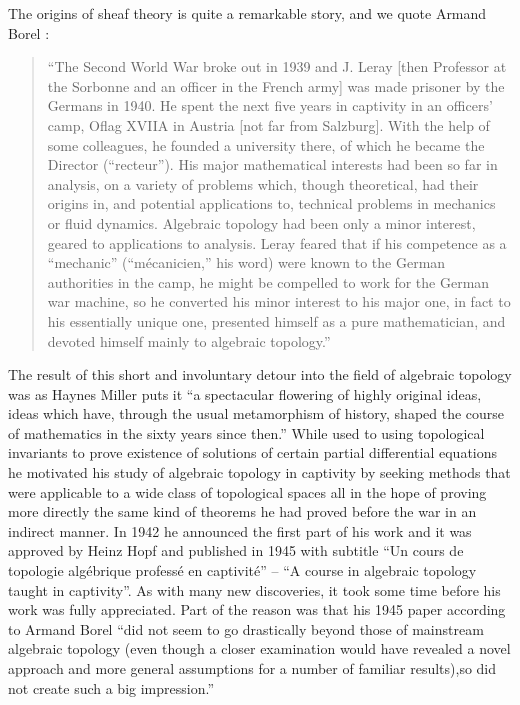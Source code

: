 \documentclass[../../thesis.tex]{subfiles}
\begin{document}
The origins of sheaf theory is quite a remarkable story, and we quote Armand Borel \cite{Borel}:
\begin{quotation}
    ``The Second World War broke out in 1939 and J. Leray [then Professor at the Sorbonne and an officer in the French army] was made prisoner by the Germans in 1940.
    He spent the next five years in captivity in an officers’ camp, Oflag XVIIA in Austria [not far from Salzburg].
    With the help of some colleagues, he founded a university there, of which he became the Director (“recteur”).
    His major mathematical interests had been so far in analysis, on a variety of problems which, though theoretical, had their origins in, and potential applications to, technical problems in mechanics or fluid dynamics.
    Algebraic topology had been only a minor interest, geared to applications to analysis. Leray feared that if his competence as a “mechanic” (“mécanicien,” his word) were known to the German authorities in the camp, he might be compelled to work for the German war machine, so he converted his minor interest to his major one, in fact to his essentially unique one, presented himself as a pure mathematician, and devoted himself mainly to algebraic topology.''
\end{quotation}
The result of this short and involuntary detour into the field of algebraic topology was as Haynes Miller \cite{H.Miller} puts it ``a spectacular flowering of highly original ideas, ideas which have, through the usual metamorphism of history, shaped the course of mathematics in the sixty years since then.''
While used to using topological invariants to prove existence of solutions of certain partial differential equations he motivated his study of algebraic topology in captivity by seeking methods that were applicable to a wide class of topological spaces all in the hope of proving more directly the same kind of theorems he had proved before the war in an indirect manner.
In 1942 he announced the first part of his work and it was approved by Heinz Hopf and published in 1945 with subtitle ``Un cours de topologie algébrique professé en captivité'' -- ``A course in algebraic topology taught in captivity''.
As with many new discoveries, it took some time before his work was fully appreciated.
Part of the reason was that his 1945 paper \cite{Leray45} according to Armand Borel \cite{BorelAMS} ``did not seem to go drastically beyond those of mainstream algebraic topology (even though a closer examination would have revealed a novel approach and more general assumptions for a number of familiar results),so \cite{Leray45} did not create such a big impression.''
\end{document}
